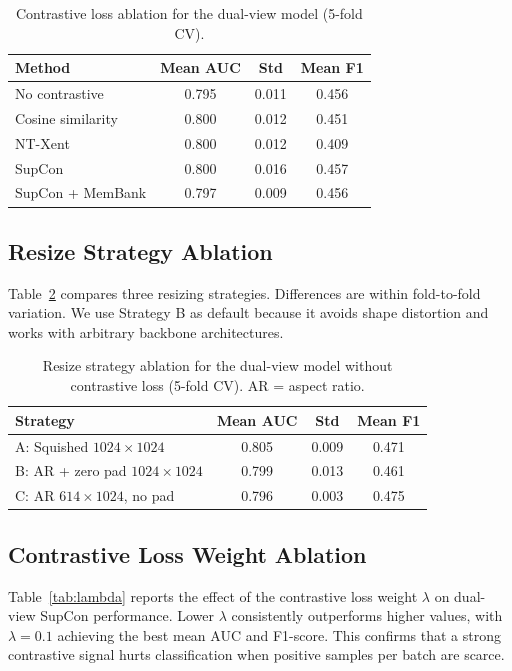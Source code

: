\documentclass[runningheads]{llncs}
\begin{document}
\begin{table}[h]
\caption{Contrastive loss ablation for the dual-view model (5-fold CV).}
\label{tab:contrastive}
\centering
\begin{tabular}{|l|c|c|c|}
\hline
\textbf{Method} & \textbf{Mean AUC} & \textbf{Std} & \textbf{Mean F1} \\
\hline
No contrastive      & 0.795 & 0.011 & 0.456 \\
Cosine similarity   & 0.800 & 0.012 & 0.451 \\
NT-Xent             & 0.800 & 0.012 & 0.409 \\
SupCon              & 0.800 & 0.016 & 0.457 \\
SupCon + MemBank    & 0.797 & 0.009 & 0.456 \\
\hline
\end{tabular}
\end{table}

\subsection{Resize Strategy Ablation}

Table~\ref{tab:resize} compares three resizing strategies. Differences are within fold-to-fold variation. We use Strategy B as default because it avoids shape distortion and works with arbitrary backbone architectures.

\begin{table}[h]
\caption{Resize strategy ablation for the dual-view model without contrastive loss (5-fold CV). AR = aspect ratio.}
\label{tab:resize}
\centering
\begin{tabular}{|l|c|c|c|}
\hline
\textbf{Strategy} & \textbf{Mean AUC} & \textbf{Std} & \textbf{Mean F1} \\
\hline
A: Squished $1024\times1024$      & 0.805 & 0.009 & 0.471 \\
B: AR + zero pad $1024\times1024$ & 0.799 & 0.013 & 0.461 \\
C: AR $614\times1024$, no pad     & 0.796 & 0.003 & 0.475 \\
\hline
\end{tabular}
\end{table}


\subsection{Contrastive Loss Weight Ablation}

Table~\ref{tab:lambda} reports the effect of the contrastive loss weight $\lambda$ on dual-view SupCon performance. Lower $\lambda$ consistently outperforms higher values, with $\lambda=0.1$ achieving the best mean AUC and F1-score. This confirms that a strong contrastive signal hurts classification when positive samples per batch are scarce.
\end{document}
